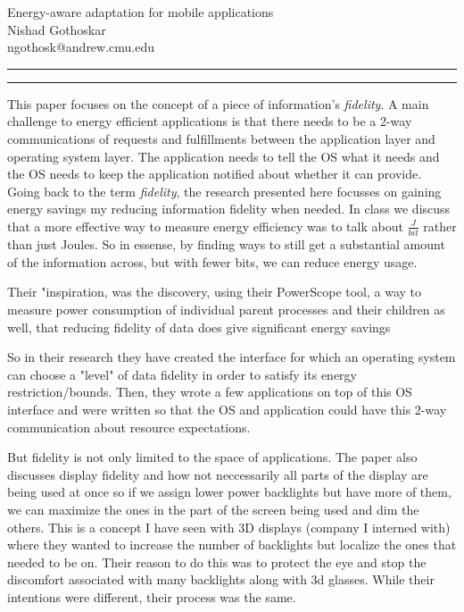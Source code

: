 \documentclass[11pt]{article}
\newcommand{\question}[2] {\vspace{.25in} \hrule\vspace{0.5em}
	\noindent{\bf #1: #2} \vspace{0.5em}
	\hrule \vspace{.10in}}
\newcommand{\myname}{Nishad Gothoskar}
\newcommand{\myandrew}{ngothosk}
\begin{document}
	
	\medskip                        %
	
	\thispagestyle{plain}
	\begin{center}                  %
		{\Large Energy-aware adaptation for mobile applications} \\
		\myname \\
		\myandrew @andrew.cmu.edu\\
	\end{center}
	
	\question{1}{Summary}
	\quad This paper focuses on the concept of a piece of information's \textit{fidelity}. A main challenge to energy efficient applications is that there needs to be a 2-way communications of requests and fulfillments between the application layer and operating system layer. The application needs to tell the OS what it needs and the OS needs to keep the application notified about whether it can provide. Going back to the term \textit{fidelity}, the research presented here focusses on gaining energy savings my reducing information fidelity when needed. In class we discuss that a more effective way to measure energy efficiency was to talk about $\frac{J}{bit}$ rather than just Joules. So in essense, by finding ways to still get a substantial amount of the information across, but with fewer bits, we can reduce energy usage.
	
	\quad Their "inspiration, was the discovery, using their PowerScope tool, a way to measure power consumption of individual parent processes and their children as well, that reducing fidelity of data does give significant energy savings
	
	\quad So in their research they have created the interface for which an operating system can choose a "level" of data fidelity in order to satisfy its energy restriction/bounds. Then, they wrote a few applications on top of this OS interface and were written so that the OS and application could have this 2-way communication about resource expectations.
	
	\quad But fidelity is not only limited to the space of applications. The paper also discusses display fidelity and how not neccessarily all parts of the display are being used at once so if we assign lower power backlights but have more of them, we can maximize the ones in the part of the screen being used and dim the others. This is a concept I have seen with 3D displays (company I interned with) where they wanted to increase the number of backlights but localize the ones that needed to be on. Their reason to do this was to protect the eye and stop the discomfort associated with many backlights along with 3d glasses. While their intentions were different, their process was the same.
	
\end{document}
